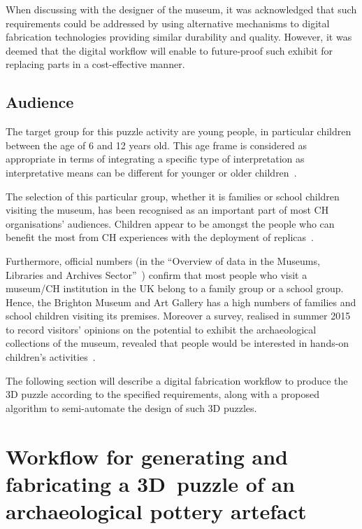 \documentclass[acmlarge,screen,dvipsnames]{acmart}
\begin{document}
When discussing with the designer of the museum, it was acknowledged
that such requirements could be addressed by using alternative
mechanisms to digital fabrication technologies providing similar
durability and quality. However, it was deemed that the digital
workflow will enable to future-proof such exhibit for replacing parts
in a cost-effective manner.

\subsection{Audience}

The target group for this puzzle activity are young people, in
particular children between the age of 6 and 12 years old. This age
frame is considered as appropriate in terms of integrating a specific
type of interpretation as interpretative means can be different for
younger or older children~\cite{Tilden1977}.

The selection of this particular group, whether it is families or
school children visiting the museum, has been recognised as an
important part of most CH organisations' audiences. Children appear to
be amongst the people who can benefit the most from CH experiences
with the deployment of replicas~\cite{Cabral2013,Neely2015,Miles2015}.

Furthermore, official numbers (in the ``Overview of data in the
Museums, Libraries and Archives Sector''~\cite{Matty2004}) confirm
that most people who visit a museum/CH institution in the UK belong to
a family group or a school group. Hence, the Brighton Museum and Art
Gallery has a high numbers of families and school children visiting
its premises. Moreover a survey, realised in summer 2015 to record
visitors' opinions on the potential to exhibit the archaeological
collections of the museum, revealed that people would be interested in
hands-on children's activities~\cite{RoyalPavilionandMuseums2015}.

The following section will describe a digital fabrication workflow to
produce the 3D puzzle according to the specified requirements, along
with a proposed algorithm to semi-automate the design of such 3D
puzzles.

\section{Workflow for generating and fabricating a
  3D~puzzle of an archaeological pottery artefact}
\label{workflow}
\end{document}
